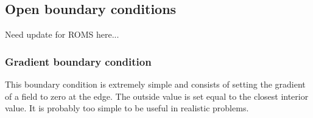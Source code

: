 


\subsection{Open boundary conditions}
Need update for ROMS here...

\subsubsection{Gradient boundary condition}
This boundary condition is extremely simple and consists of setting the
gradient of a field to zero at the edge. The outside value is set equal
to the closest interior value. It is probably too simple to be useful
in realistic problems.

